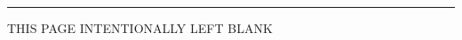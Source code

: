  


 


\newpage

\newpage
\thispagestyle{plain}
\hrule height 0pt
\vskip 4.5in
\begin{center}
THIS PAGE INTENTIONALLY LEFT BLANK
\end{center}


\newpage

\newpage

\newpage

\newpage


\pagestyle{plain}
\newpage
\tableofcontents
\newpage
\listoffigures
\newpage
\listoftables
\newpage


\pagestyle{fancy}

\newpage


\newpage


\newpage


\newpage


\newpage


\newpage


\newpage


\newpage


\pagestyle{plain}






\newpage

\newpage	
\newpage
\newpage






